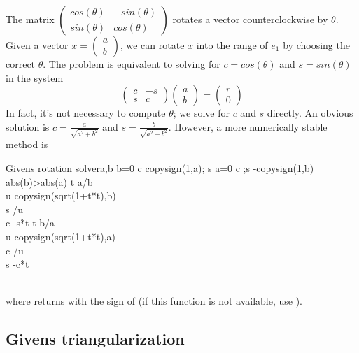 The matrix $\begin{pmatrix} cos(\theta) & -sin(\theta) \\ sin(\theta) & cos(\theta) \end{pmatrix}$ rotates a vector counterclockwise by $\theta$. Given a vector $x = \begin{pmatrix} a \\ b \end{pmatrix}$, we can rotate $x$ into the range of $e_1$ by choosing the correct $\theta$. The problem is equivalent to solving for $c = cos(\theta)$ and $s = sin(\theta)$ in the system
\begin{equation}
\label{eq:Givens rotation system}
\begin{pmatrix} c & -s \\ s & c \end{pmatrix} \begin{pmatrix}a\\b\end{pmatrix} 
= \begin{pmatrix}r\\0\end{pmatrix}
\end{equation}
 In fact, it's not necessary to compute $\theta$; we solve for $c$ and $s$ directly. An obvious solution is $c = \frac{a}{\sqrt{a^2 + b^2}}$ and $s = \frac{b}{\sqrt{a^2+b^2}}$. However, a more numerically stable method is 
 
 \begin{pseudo}{Givens rotation solver}{a,b}
 \label{Alg:Givens rotation solver}
\IF b=0 \THEN c \GETS copysign(1,a); s  
\ELSEIF a=0 \THEN c ;s \GETS -copysign(1,b)
\ELSEIF abs(b)>abs(a) \THEN
\BEGIN
	t \GETS a/b\\
	u \GETS copysign(sqrt(1+t*t),b)\\
	s /u\\
	c \GETS -s*t
\END
\ELSE
\BEGIN
	t \GETS b/a \\
	u \GETS copysign(sqrt(1+t*t),a)\\
	c /u\\
	s \GETS -c*t 
\END
\end{pseudo}\\
where  returns  with the sign of  (if this function is not available, use ).

\subsection*{Givens triangularization}

